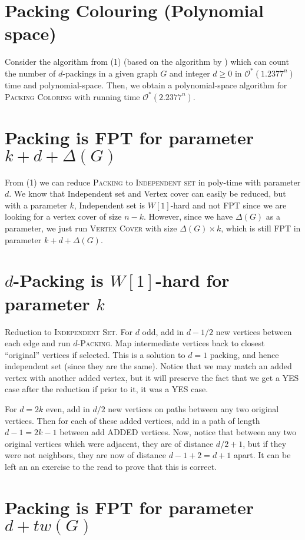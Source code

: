 \documentclass[10pt, a4paper]{article}
\theoremstyle{definition}
\newcommand{\mcO}{\mathcal{O}}
\begin{document}
\section{\sc Packing Colouring (\textnormal{Polynomial space})}


Consider the algorithm from (1) (based on the algorithm by \cite{Wahlstr2008,Dahllof2005}) which can count the number of $d$-packings in a given graph $G$ and integer $d \ge 0$ in $\mcO^*(1.2377^n)$ time and polynomial-space. Then, we obtain  a polynomial-space algorithm for \textsc{Packing Coloring} with running time $\mcO^*(2.2377^n)$.

\section{\sc Packing \textnormal{is FPT for parameter $k + d + \Delta (G)$} }


From (1) we can reduce \textsc{Packing} to \textsc{Independent set} in poly-time with parameter $d$. We know that Independent set and Vertex cover can easily be reduced, but with a parameter $k$, Independent set is $W[1]$-hard and not FPT since we are looking for a vertex cover of size $n-k$. However, since we have $\Delta(G)$ as a parameter, we just run \textsc{Vertex Cover} with size $\Delta(G) \times k$, which is still FPT in parameter $k + d + \Delta(G)$.

\section{$d$-\sc Packing \textnormal{is $W[1]$-hard for parameter $k$}}


Reduction to \textsc{Independent Set}. For $d$ odd, add in $d-1/2$ new vertices between each edge and run $d$-\textsc{Packing}. Map intermediate vertices back to closest ``original'' vertices if selected. This is a solution to $d=1$ packing, and hence independent set (since they are the same). Notice that we may match an added vertex with another added vertex, but it will preserve the fact that we get a YES case after the reduction if prior to it, it was a YES case.

For $d = 2k$ even, add in $d/2$ new vertices on paths between any two original vertices. Then for each of these added vertices, add in a path of length $d-1 = 2k-1$ between add ADDED vertices. Now, notice that between any two original vertices which were adjacent, they are of distance $d/2 + 1$, but if they were not neighbors, they are now of distance $d-1 + 2 = d+1$ apart. It can be left an an exercise to the read to prove that this is correct.

\section{\sc Packing \textnormal{is FPT for parameter $d + tw(G)$}}




\end{document}
